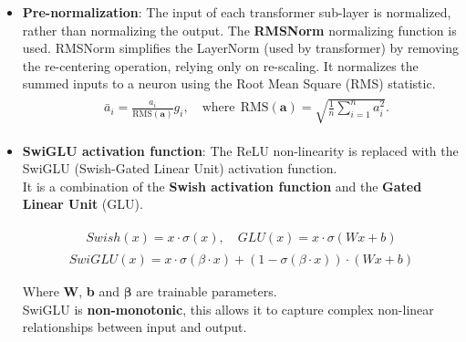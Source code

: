\documentclass{article}
\begin{document}
		\begin{itemize}
		
			\item 
				\textbf{Pre-normalization}: The input of each transformer sub-layer is normalized, rather than normalizing the output. The \textbf{RMSNorm} normalizing function \cite{zhang2019rootmeansquarelayer} is used. RMSNorm simplifies the LayerNorm (used by transformer) by removing the re-centering operation, relying only on re-scaling. It normalizes the summed inputs to a neuron using the Root Mean Square (RMS) statistic.
				\begin{align}\label{eq_rmsnorm}
					\begin{split}
						& \bar{a}_i = \frac{a_i}{\text{RMS}(\mathbf{a})} g_i, \quad \text{where}~~ \text{RMS}(\mathbf{a}) = \sqrt{\frac{1}{n} \sum_{i=1}^{n} a_i^2}.
					\end{split}
				\end{align}
			
			\item
				\textbf{SwiGLU activation function}: The ReLU non-linearity is replaced with the SwiGLU (Swish-Gated Linear Unit) activation function. \\
				It is a combination of the \textbf{Swish activation function} and the \textbf{Gated Linear Unit} (GLU).
				
				\begin{align}\label{eq_swish_func}
					\begin{split}
						Swish(x) = x \cdot \sigma(x),  \quad GLU(x) = x \cdot \sigma(Wx + b)
					\end{split}
				\end{align}
				\begin{align}
					SwiGLU(x) = x \cdot \sigma(\beta \cdot x) + (1 - \sigma(\beta \cdot x)) \cdot (Wx + b)
				\end{align}
				
				Where \textbf{W}, \textbf{b} and $\boldsymbol{\beta}$  are trainable parameters. \\
				SwiGLU is \textbf{non-monotonic}, this allows it to capture complex non-linear relationships between input and output.
			

\end{itemize}
\end{document}
